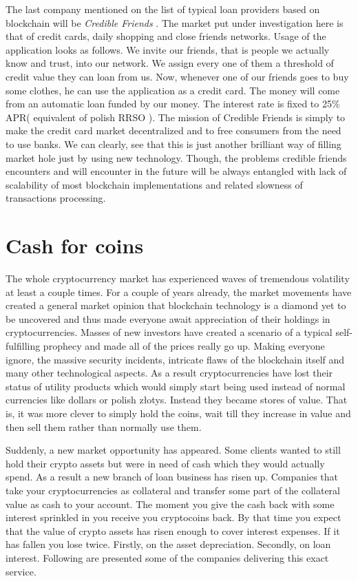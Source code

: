 \documentclass[a4paper,12pt,twoside,openany]{report}
\begin{document}
The last company mentioned on the list of typical loan providers based on blockchain will be \textit{Credible Friends} \cite{credible}. The market put under investigation here is that of credit cards, daily shopping and close friends networks. Usage of the application looks as follows. We invite our friends, that is people we actually know and trust, into our network. We assign every one of them a threshold of credit value they can loan from us. Now, whenever one of our friends goes to buy some clothes, he can use the application as a credit card. The money will come from an automatic loan funded by our money.   The interest rate is fixed to 25\% APR( equivalent of polish RRSO ). The mission of Credible Friends is simply to make the credit card market decentralized and to free consumers from the need to use banks. We can clearly, see that this is just another brilliant way of filling market hole just by using new technology. Though, the problems credible friends encounters and will encounter in the future will be always entangled with lack of scalability of most blockchain implementations and related slowness of transactions processing.

\section{Cash for coins}

The whole cryptocurrency market has experienced waves of tremendous volatility at least a couple times. For a couple of years already, the market movements have created a general market opinion that blockchain technology is a diamond yet to be uncovered and thus made everyone await appreciation of their holdings in cryptocurrencies. Masses of new investors have created a scenario of a typical self-fulfilling prophecy and made all of the prices really go up. Making everyone ignore, the massive security incidents, intricate flaws of the blockchain itself and many other technological aspects. As a result cryptocurrencies have lost their status of utility products which would simply start being used instead of normal currencies like dollars or polish złotys. Instead they became stores of value. That is, it was more  clever to simply hold the coins, wait till they increase in value and then sell them rather than normally use them. 

Suddenly, a new market opportunity has appeared. Some clients wanted to still hold their crypto assets but were in need of cash which they would actually spend. As a result a new branch of loan business has risen up. Companies that take your cryptocurrencies as collateral and transfer some part of the collateral value as cash to your account. The moment you give the cash back with some interest sprinkled in you receive you cryptocoins back. By that time you expect that the value of crypto assets has risen enough to cover interest expenses. If it has fallen you lose twice. Firstly, on the asset depreciation. Secondly, on loan interest. Following are presented some of the companies delivering this exact service.
\end{document}

